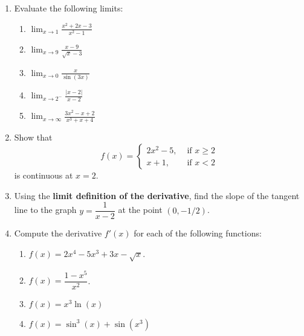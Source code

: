 \documentclass[12pt]{article}
\newcommand{\points}[1]{\marginpar{\hspace{24pt}[#1]}}
\newcommand{\di}{\displaystyle}
\newcommand{\abs}[1]{\lvert #1\rvert}
\begin{document}
 \begin{enumerate}
 \item  Evaluate the following limits:
 \begin{enumerate}
 \item $\di \lim_{x\to 1}\frac{x^2+2x-3}{x^2-1}$ \points{2}
 
 
 
 \item $\di \lim_{x\to 9}\frac{x-9}{\sqrt{x}-3}$ \points{2}
 
 
 
 \item $\di \lim_{x\to 0}\frac{x}{\sin(3x)}$ \points{2}
 
 
 
 \item $\di \lim_{x\to 2^-}\frac{\abs{x-2}}{x-2}$ \points{2}
 
 
 
 \item $\di\lim_{x\to \infty}\frac{3x^2-x+2}{x^3+x+4}$ \points{2}
 \end{enumerate}

 
 \item Show that \points{5}
 \[
 f(x) = \begin{cases} 2x^2-5, & \text{ if } x\geq 2\\ x+1, & \text{ if } x<2\end{cases}
 \]
 is continuous at $x=2$.
 
 
 \item Using the \textbf{limit definition of the derivative}, find the slope of the tangent line to the graph $y=\dfrac{1}{x-2}$ at the point $(0,-1/2)$. \points{5}
 

 
 \item Compute the derivative $f'(x)$ for each of the following functions:
 \begin{enumerate}
 \item $f(x) = 2x^4-5x^3+3x-\sqrt{x}$. \points{2}
 

 
 \item $f(x) = \dfrac{1-x^5}{x^2}$. \points{2}
 

 
 \item $f(x) = x^3\ln(x)$ \points{2}
 

 
 \item $f(x) = \sin^3(x)+\sin(x^3)$ \points{2}
 


\end{enumerate}
\end{enumerate}
\end{document}

